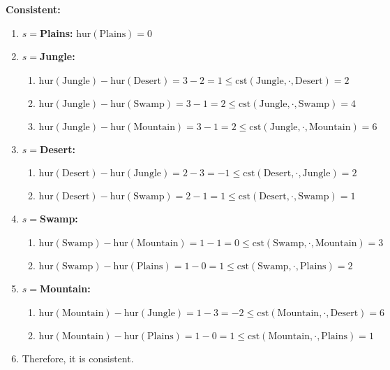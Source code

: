\begin{example}
    \textbf{Consistent:}
    \begin{enumerate}
        \item \textbf{$s=$Plains:} $\text{hur}(\text{Plains}) = 0$
        \item \textbf{$s=$Jungle:}
        \begin{enumerate}
            \item $\text{hur}(\text{Jungle}) - \text{hur}(\text{Desert}) = 3 - 2 = 1 \leq \text{cst}(\text{Jungle}, \cdot, \text{Desert}) = 2$
            \item $\text{hur}(\text{Jungle}) - \text{hur}(\text{Swamp}) = 3 - 1 = 2 \leq \text{cst}(\text{Jungle}, \cdot, \text{Swamp}) = 4$
            \item $\text{hur}(\text{Jungle}) - \text{hur}(\text{Mountain}) = 3 - 1 = 2 \leq \text{cst}(\text{Jungle}, \cdot, \text{Mountain}) = 6$
        \end{enumerate}
        \item \textbf{$s=$Desert:} 
        \begin{enumerate}
            \item $\text{hur}(\text{Desert}) - \text{hur}(\text{Jungle}) = 2 - 3 = -1 \leq \text{cst}(\text{Desert}, \cdot, \text{Jungle}) = 2$
            \item $\text{hur}(\text{Desert}) - \text{hur}(\text{Swamp}) = 2 - 1 = 1 \leq \text{cst}(\text{Desert}, \cdot, \text{Swamp}) = 1$
        \end{enumerate}
        \item \textbf{$s=$Swamp:}
        \begin{enumerate}
             \item $\text{hur}(\text{Swamp}) - \text{hur}(\text{Mountain}) = 1 - 1 = 0 \leq \text{cst}(\text{Swamp}, \cdot, \text{Mountain}) = 3$
            \item $\text{hur}(\text{Swamp}) - \text{hur}(\text{Plains}) = 1 - 0 = 1 \leq \text{cst}(\text{Swamp}, \cdot, \text{Plains}) = 2$
        \end{enumerate}
        \item \textbf{$s=$Mountain:} 
        \begin{enumerate}
            \item $\text{hur}(\text{Mountain}) - \text{hur}(\text{Jungle}) = 1 - 3 = -2 \leq \text{cst}(\text{Mountain}, \cdot, \text{Desert}) = 6$
            \item $\text{hur}(\text{Mountain}) - \text{hur}(\text{Plains}) = 1 - 0 = 1 \leq \text{cst}(\text{Mountain}, \cdot, \text{Plains}) = 1$
        \end{enumerate}
        \item Therefore, it is consistent.
    \end{enumerate}
\end{example}
\newpage


